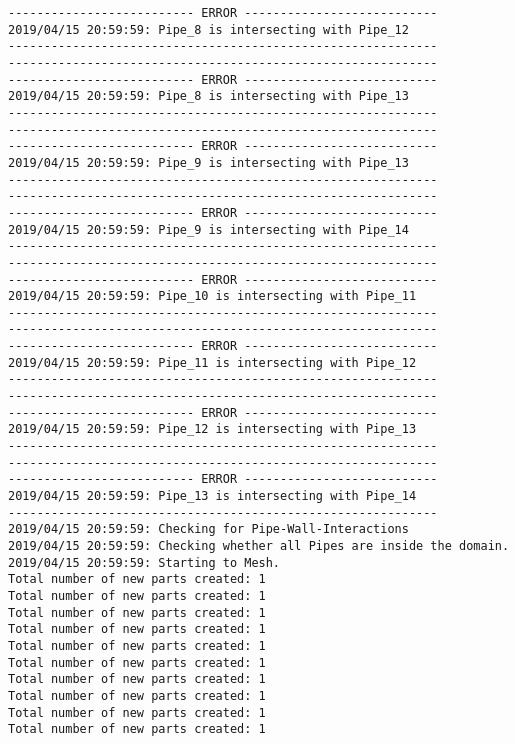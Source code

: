 \documentclass{article}
\begin{document}
{\begin{verbatim}
-------------------------- ERROR ---------------------------
2019/04/15 20:59:59: Pipe_8 is intersecting with Pipe_12
------------------------------------------------------------
------------------------------------------------------------
-------------------------- ERROR ---------------------------
2019/04/15 20:59:59: Pipe_8 is intersecting with Pipe_13
------------------------------------------------------------
------------------------------------------------------------
-------------------------- ERROR ---------------------------
2019/04/15 20:59:59: Pipe_9 is intersecting with Pipe_13
------------------------------------------------------------
------------------------------------------------------------
-------------------------- ERROR ---------------------------
2019/04/15 20:59:59: Pipe_9 is intersecting with Pipe_14
------------------------------------------------------------
------------------------------------------------------------
-------------------------- ERROR ---------------------------
2019/04/15 20:59:59: Pipe_10 is intersecting with Pipe_11
------------------------------------------------------------
------------------------------------------------------------
-------------------------- ERROR ---------------------------
2019/04/15 20:59:59: Pipe_11 is intersecting with Pipe_12
------------------------------------------------------------
------------------------------------------------------------
-------------------------- ERROR ---------------------------
2019/04/15 20:59:59: Pipe_12 is intersecting with Pipe_13
------------------------------------------------------------
------------------------------------------------------------
-------------------------- ERROR ---------------------------
2019/04/15 20:59:59: Pipe_13 is intersecting with Pipe_14
------------------------------------------------------------
2019/04/15 20:59:59: Checking for Pipe-Wall-Interactions
2019/04/15 20:59:59: Checking whether all Pipes are inside the domain.
2019/04/15 20:59:59: Starting to Mesh.
Total number of new parts created: 1
Total number of new parts created: 1
Total number of new parts created: 1
Total number of new parts created: 1
Total number of new parts created: 1
Total number of new parts created: 1
Total number of new parts created: 1
Total number of new parts created: 1
Total number of new parts created: 1
Total number of new parts created: 1
\end{verbatim}
}
\clearpage
\end{document}
